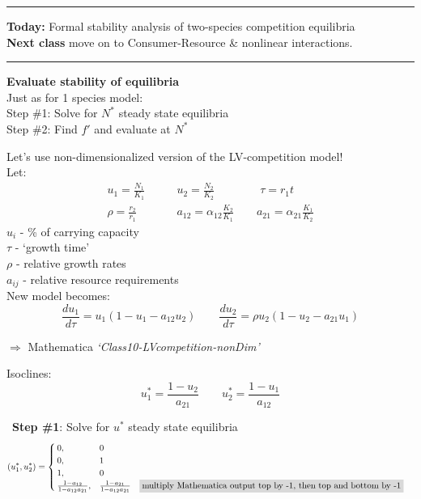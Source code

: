 \documentclass{article}
\newcommand{\note}[1]{\colorbox{gray!30}{#1}}
\newcommand{\ind}{\-\hspace{1cm}}
\begin{document}
\noindent{}
\rule[0.5ex]{\linewidth}{1pt}
\textbf{Today:} 
\ind Formal stability analysis of two-species competition equilibria\\
\textbf{Next class} move on to Consumer-Resource \& nonlinear interactions.

\rule[0.5ex]{\linewidth}{1pt}

\textbf{Evaluate stability of equilibria} \\
Just as for 1 species model:\\
\ind Step \#1: Solve for $N^*$ steady state equilibria\\
\ind Step \#2: Find $f'$ and evaluate at $N^*$

Let's use non-dimensionalized version of the LV-competition model!\\
Let:
\begin{align*}
	u_1 = \frac{N_1}{K_1} \quad & \quad u_2 = \frac{N_2}{K_2} \quad  \quad \quad \quad \tau = r_1 t\\
	\rho = \frac{r_2}{r_1} \quad & \quad a_{12}=\alpha_{12}\frac{K_2}{K_1} \quad \quad a_{21}=\alpha_{21}\frac{K_1}{K_2} 
\end{align*}
\ind $u_i$ - \% of carrying capacity\\
\ind $\tau$ - `growth time'\\
\ind $\rho$ - relative growth rates\\
\ind $a_{ij}$ - relative resource requirements\\


New model becomes:
\begin{equation*}
	\frac{d u_1}{d\tau}=u_1(1-u_1 - a_{12}u_2) \quad \quad \frac{d u_2}{d\tau}=\rho u_2(1-u_2 - a_{21}u_1)
\end{equation*}

\note{$\Rightarrow$ Mathematica \emph{`Class10-LVcompetition-nonDim'}}
\vspace{0.5cm}

Isoclines:
\begin{equation*}
	u_1^*=\frac{1-u_2}{a_{21}} \quad \quad u_2^*=\frac{1-u_1}{a_{12}}
\end{equation*}

\
\textbf{Step \#1}: Solve for $u^*$ steady state equilibria
\begin{align*}
(u_1^*,u_2^*)& =
\begin{cases}
	 0 , & 0  \\
	0, & 1  \\
	1, & 0\\
	\frac{1-a_{12}}{1- a_{12} a_{21} }, & \frac{1-a_{21}}{1- a_{12} a_{21} } \quad \text{\note{multiply Mathematica output top by -1, then top and bottom by -1}}
\end{cases}
\end{align*}
\end{document}
